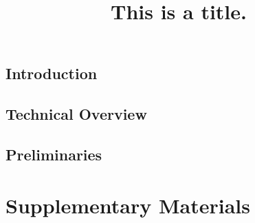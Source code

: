\documentclass[envcountsame,runningheads,notitlepage]{llncs}
\begin{document}
\title{This is a title.}

\author{}
\institute{}

\date{}
\maketitle

\setcounter{tocdepth}{2}

\begin{abstract}
    
\end{abstract}

\thispagestyle{plain}
\pagestyle{plain}

\newpage

\section{Introduction}
\label{sec:intro}
%

\section{Technical Overview}
\label{sec:tech-overview}
%

\section{Preliminaries}
\label{sec:preliminaries}
%


% 




\newpage
\appendix
\chapter*{Supplementary Materials}


\begingroup
\let\cleardoublepage\relax
\let\clearpage\relax
\tableofcontents
\endgroup


%
\end{document}
